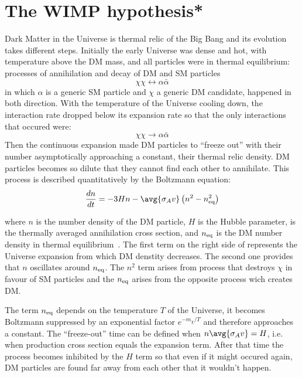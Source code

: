 \section{The WIMP hypothesis*}
\label{sec:wimp}
Dark Matter in the Universe is thermal relic of the Big Bang and its evolution takes different steps. Initially the early Universe was dense and hot, with temperature above the DM mass, and all particles were in thermal equilibrium: processes of annihilation and decay of DM and SM particles 
\begin{equation}
\chi\chi\longleftrightarrow \alpha\bar{\alpha}
\end{equation}
in which $\alpha$ is a generic SM particle and $\chi$ a generic DM candidate, happened in both direction. With the temperature of the Universe cooling down, the interaction rate dropped below its expansion rate so that the only interactions that occured were:
\begin{equation}
\chi\chi\rightarrow \alpha\bar{\alpha}
\label{chitosm}
\end{equation}
Then the continuous expansion made DM particles to ``freeze out'' with their number asymptotically approaching a constant, their thermal relic density. DM particles becomes so dilute that they cannot find each other to annihilate. This process is described quantitatively by the Boltzmann equation:
\begin{equation}
\frac{dn}{dt}=-3Hn-\avg{\sigma_A v}\left(n^2-n_{\textup{eq}}^2\right)
\label{eqn:boltz}
\end{equation}

where $n$ is the number density of the DM particle, $H$ is the Hubble parameter,  is the thermally averaged annihilation cross section, and $n_{\textup{eq}}$ is the DM number density in thermal equilibrium~\cite{feng:DM}. The first term on the right side of \Eqn{\ref{eqn:boltz}} represents the Universe expansion from which DM denstity decreases. The second one provides that $n$ oscillates around $n_\textup{eq}$. The $n^2$ term arises from \Eqn{\ref{chitosm}} process that destroys $\chi$ in favour of SM particles and the $n_\textup{eq}$ arises from the opposite process wich creates DM.

The term $n_\textup{eq}$ depends on the temperature $T$ of the Universe, it becomes Boltzmann suppressed by an exponential factor $e^{-m_\chi/T}$ and therefore approaches a constant. The ``freeze-out'' time can be defined when $n\avg{\sigma_A v} = H$, i.e. when production cross section equals the expansion term. After that time the \Eqn{\ref{chitosm}} process becomes inhibited by the $H$ term so that even if it might occured again, DM particles are found far away from each other that it wouldn't happen.  

